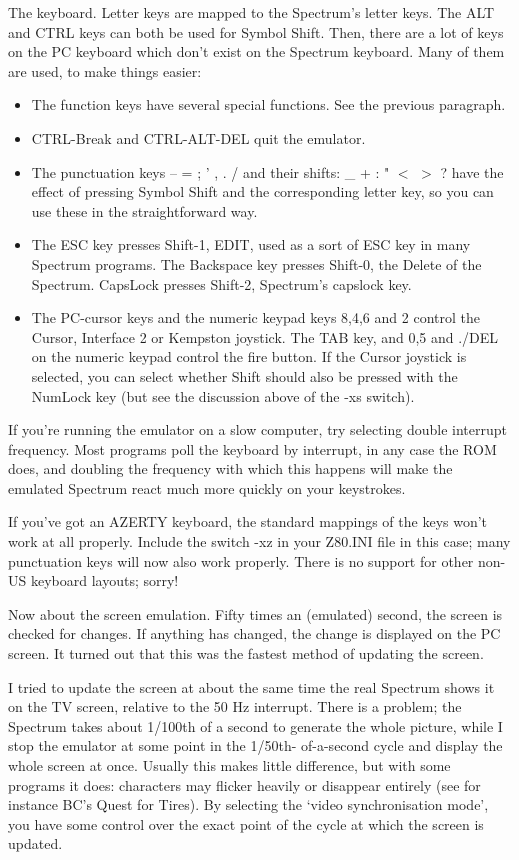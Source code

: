    The keyboard.  Letter keys are mapped to the Spectrum's letter keys. The
    ALT and CTRL keys can both be used for Symbol Shift.  Then, there are a
    lot of keys on the PC keyboard which don't exist on the Spectrum
    keyboard.  Many of them are used, to make things easier:
\begin{itemize}
  \item  The function keys have several special functions.  See the previous
    paragraph.
  \item
    CTRL-Break and CTRL-ALT-DEL quit the emulator.
  \item
    The punctuation keys -- = ; ' , .  / and their shifts: \_ + : " $<$ $>$ ?
    have the effect of pressing Symbol Shift and the corresponding letter key,
    so you can use these in the straightforward way.
  \item
    The ESC key presses Shift-1, EDIT, used as a sort of ESC key in many
    Spectrum programs.  The Backspace key presses Shift-0, the Delete of the
    Spectrum.  CapsLock presses Shift-2, Spectrum's capslock key.
  \item
    The PC-cursor keys and the numeric keypad keys 8,4,6 and 2 control the
    Cursor, Interface 2 or Kempston joystick.  The TAB key, and 0,5 and
    ./DEL on the numeric keypad control the fire button.  If the Cursor
    joystick is selected, you can select whether Shift should also be
    pressed with the NumLock key (but see the discussion above of the -xs
    switch).
\end{itemize}
    If you're running the emulator on a slow computer, try selecting double
    interrupt frequency.  Most programs poll the keyboard by interrupt, in
    any case the ROM does, and doubling the frequency with which this
    happens will make the emulated Spectrum react much more quickly on your
    keystrokes.

    If you've got an AZERTY keyboard, the standard mappings of the keys
    won't work at all properly.  Include the switch -xz in your Z80.INI file
    in this case; many punctuation keys will now also work properly. There
    is no support for other non-US keyboard layouts; sorry!


    Now about the screen emulation.  Fifty times an (emulated) second, the
    screen is checked for changes.  If anything has changed, the change is
    displayed on the PC screen.  It turned out that this was the fastest
    method of updating the screen.

    I tried to update the screen at about the same time the real Spectrum
    shows it on the TV screen, relative to the 50 Hz interrupt.  There is a
    problem; the Spectrum takes about 1/100th of a second to generate the
    whole picture, while I stop the emulator at some point in the 1/50th-
    of-a-second cycle and display the whole screen at once.  Usually this
    makes little difference, but with some programs it does: characters may
    flicker heavily or disappear entirely (see for instance BC's Quest for
    Tires).  By selecting the `video synchronisation mode', you have some
    control over the exact point of the cycle at which the screen is
    updated.

